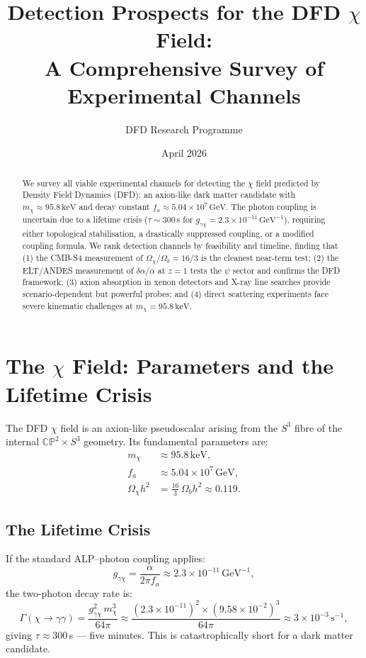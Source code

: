 \documentclass[12pt,a4paper]{article}
\title{Detection Prospects for the DFD $\chi$ Field:\\
A Comprehensive Survey of Experimental Channels}
\author{DFD Research Programme}
\date{April 2026}
\newcommand{\keV}{\,\mathrm{keV}}
\newcommand{\GeV}{\,\mathrm{GeV}}
\begin{document}
\maketitle

\begin{abstract}
We survey all viable experimental channels for detecting the $\chi$ field
predicted by Density Field Dynamics (DFD): an axion-like dark matter
candidate with $m_\chi \approx 95.8\keV$ and decay constant
$f_a \approx 5.04 \times 10^7\GeV$. The photon coupling is uncertain
due to a lifetime crisis ($\tau \sim 300$\,s for
$g_{\gamma\chi} = 2.3 \times 10^{-11}\,\mathrm{GeV}^{-1}$),
requiring either topological stabilisation, a drastically suppressed coupling,
or a modified coupling formula. We rank detection channels by feasibility
and timeline, finding that (1) the CMB-S4 measurement of
$\Omega_\chi/\Omega_b = 16/3$ is the cleanest near-term test;
(2) the ELT/ANDES measurement of $\delta\alpha/\alpha$ at $z=1$ tests
the $\psi$ sector and confirms the DFD framework; (3) axion absorption
in xenon detectors and X-ray line searches provide scenario-dependent
but powerful probes; and (4) direct scattering experiments face
severe kinematic challenges at $m_\chi = 95.8\keV$.
\end{abstract}

\tableofcontents
\newpage

\section{The $\chi$ Field: Parameters and the Lifetime Crisis}

The DFD $\chi$ field is an axion-like pseudoscalar arising from the
$S^3$ fibre of the internal $\mathbb{CP}^2 \times S^3$ geometry.
Its fundamental parameters are:
%
\begin{align}
m_\chi &\approx 95.8\keV, \\
f_a &\approx 5.04 \times 10^7\GeV, \\
\Omega_\chi h^2 &= \frac{16}{3}\,\Omega_b h^2 \approx 0.119.
\end{align}

\subsection{The Lifetime Crisis}

If the standard ALP--photon coupling applies:
\begin{equation}
g_{\gamma\chi} = \frac{\alpha}{2\pi f_a} \approx 2.3 \times 10^{-11}\,\mathrm{GeV}^{-1},
\end{equation}
the two-photon decay rate is:
\begin{equation}
\Gamma(\chi \to \gamma\gamma) = \frac{g_{\gamma\chi}^2\,m_\chi^3}{64\pi}
\approx \frac{(2.3 \times 10^{-11})^2 \times (9.58 \times 10^{-2})^3}{64\pi}
\approx 3 \times 10^{-3}\,\mathrm{s}^{-1},
\end{equation}
giving $\tau \approx 300$\,s --- five minutes. This is catastrophically
short for a dark matter candidate.
\end{document}
